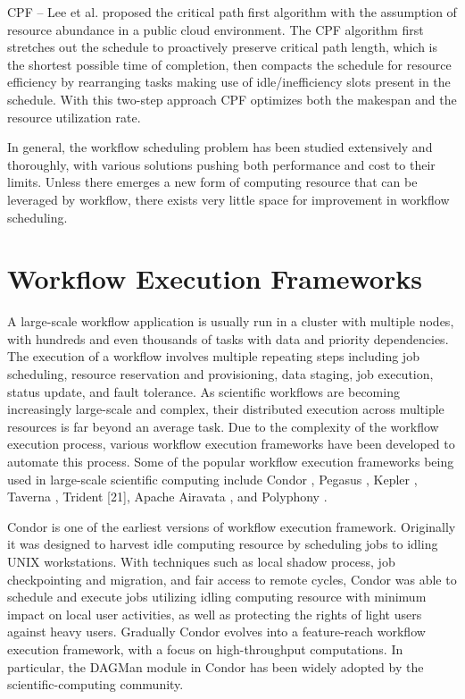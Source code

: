 CPF -- Lee et al. \cite{lee2013stretch} proposed the critical path first algorithm with the assumption of resource abundance in a public cloud environment. The CPF algorithm first stretches out the schedule to proactively preserve critical path length, which is the shortest possible time of completion, then compacts the schedule for resource efficiency by rearranging tasks making use of idle/inefficiency slots present in the schedule. With this two-step approach CPF optimizes both the makespan and the resource utilization rate.

In general, the workflow scheduling problem has been studied extensively and thoroughly, with various solutions pushing both performance and cost to their limits. Unless there emerges a new form of computing resource that can be leveraged by workflow, there exists very little space for improvement in workflow scheduling.

\section{Workflow Execution Frameworks}
\label{sec:workflow_execution_frameworks}


A large-scale workflow application is usually run in a cluster with multiple nodes, with hundreds and even thousands of tasks with data and priority dependencies. The execution of a workflow involves multiple repeating steps including job scheduling, resource reservation and provisioning, data staging, job execution, status update, and fault tolerance. As scientific workflows are becoming increasingly large-scale and complex, their distributed execution across multiple resources is far beyond an average task. Due to the complexity of the workflow execution process, various workflow execution frameworks have been developed to automate this process. Some of the popular workflow execution frameworks being used in large-scale scientific computing include Condor \cite{couvares2007workflow} \cite{litzkow1988condor}, Pegasus \cite{deelman2004pegasus}, Kepler \cite{altintas2004kepler}, Taverna \cite{oinn2004taverna}, Trident \cite{barga2008trident} \cite{simmhan2009building}[21], Apache Airavata \cite{marru2011apache}, and Polyphony \cite{shams2010polyphony}. 

Condor is one of the earliest versions of workflow execution framework. Originally it was designed to harvest idle computing resource by scheduling jobs to idling UNIX workstations. With techniques such as local shadow process, job checkpointing and migration, and fair access to remote cycles, Condor was able to schedule and execute jobs utilizing idling computing resource with minimum impact on local user activities, as well as protecting the rights of light users against heavy users. Gradually Condor evolves into a feature-reach workflow execution framework, with a focus on high-throughput computations. In particular, the DAGMan module in Condor has been widely adopted by the scientific-computing community.

